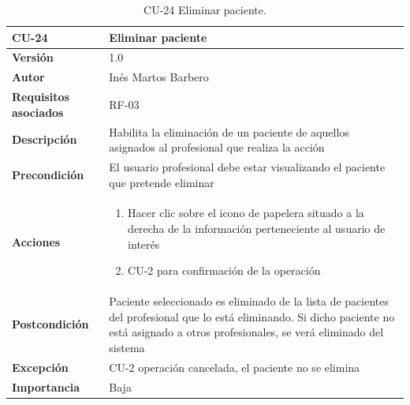 
\begin{table}[p]
	\centering
	\begin{tabularx}{\linewidth}{ p{} p{} }
		\toprule
		\textbf{CU-24}    & \textbf{Eliminar paciente}\\
		\toprule
		\textbf{Versión}              & 1.0    \\
		\textbf{Autor}                & Inés Martos Barbero \\
		\textbf{Requisitos asociados} & RF-03 \\
		\textbf{Descripción}          & Habilita la eliminación de un paciente de aquellos asignados al profesional que realiza la acción \\
		\textbf{Precondición}         & El usuario profesional debe estar visualizando el paciente que pretende eliminar \\
		\textbf{Acciones}             &
		\begin{enumerate}
			\def\labelenumi{\arabic{enumi}.}
			\tightlist
			\item Hacer clic sobre el icono de papelera situado a la derecha de la información perteneciente al usuario de interés
			\item CU-2 para confirmación de la operación
		\end{enumerate}\\
		\textbf{Postcondición}        & Paciente seleccionado es eliminado de la lista de pacientes del profesional que lo está eliminando. Si dicho paciente no está asignado a otros profesionales, se verá eliminado del sistema \\
		\textbf{Excepción}          & CU-2 operación cancelada, el paciente no se elimina \\
		\textbf{Importancia}          & Baja \\
		\bottomrule
	\end{tabularx}
	\caption{CU-24 Eliminar paciente.}
\end{table}


